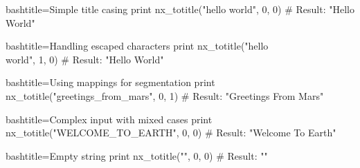 \begin{NexCodeBox}{bash}{title={Simple title casing}}
	print nx_totitle("hello world", 0, 0)
	# Result: "Hello World"
\end{NexCodeBox}

\begin{NexCodeBox}{bash}{title={Handling escaped characters}}
	print nx_totitle("hello\\ world", 1, 0)
	# Result: "Hello World"
\end{NexCodeBox}

\begin{NexCodeBox}{bash}{title={Using mappings for segmentation}}
	print nx_totitle("greetings_from_mars", 0, 1)
	# Result: "Greetings From Mars"
\end{NexCodeBox}

\begin{NexCodeBox}{bash}{title={Complex input with mixed cases}}
	print nx_totitle("WELCOME_TO_EARTH", 0, 0)
	# Result: "Welcome To Earth"
\end{NexCodeBox}

\begin{NexCodeBox}{bash}{title={Empty string}}
	print nx_totitle("", 0, 0)
	# Result: ""
\end{NexCodeBox}



